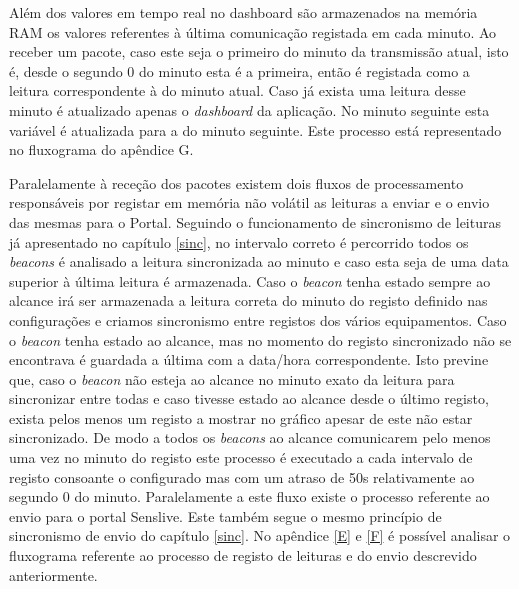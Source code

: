 \par Além dos valores em tempo real no dashboard são armazenados na memória RAM os valores referentes à última comunicação registada em cada minuto. Ao receber um pacote, caso este seja o primeiro do minuto da transmissão atual, isto é, desde o segundo 0 do minuto esta é a primeira, então é registada como a leitura correspondente à do minuto atual. Caso já exista uma leitura desse minuto é atualizado apenas o \textit{dashboard} da aplicação. No minuto seguinte esta variável é atualizada para a do minuto seguinte. Este processo está representado no fluxograma do apêndice {G}.

\par Paralelamente à receção dos pacotes existem dois fluxos de processamento responsáveis por registar em memória não volátil as leituras a enviar e o envio das mesmas para o Portal. Seguindo o funcionamento de sincronismo de leituras já apresentado no capítulo \ref{sinc}, no intervalo correto é percorrido todos os \textit{beacons} é analisado a leitura sincronizada ao minuto e caso esta seja de uma data superior à última leitura é armazenada. Caso o \textit{beacon} tenha estado sempre ao alcance irá ser armazenada a leitura correta do minuto do registo definido nas configurações e criamos sincronismo entre registos dos vários equipamentos. Caso o \textit{beacon} tenha estado ao alcance, mas no momento do registo sincronizado não se encontrava é guardada a última com a data/hora correspondente. Isto previne que, caso o \textit{beacon} não esteja ao alcance no minuto exato da leitura para sincronizar entre todas e caso tivesse estado ao alcance desde o último registo, exista pelos menos um registo a mostrar no gráfico apesar de este não estar sincronizado. De modo a todos os \textit{beacons} ao alcance comunicarem pelo menos uma vez no minuto do registo este processo é executado a cada intervalo de registo consoante o configurado mas com um atraso de 50s relativamente ao segundo 0 do minuto. Paralelamente a este fluxo existe o processo referente ao envio para o portal Senslive. Este também segue o mesmo princípio de sincronismo de envio do capítulo \ref{sinc}. No apêndice \ref{E} e \ref{F} é possível analisar o fluxograma referente ao processo de registo de leituras e do envio descrevido anteriormente.


